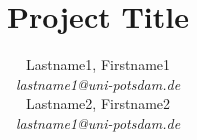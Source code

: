 \documentclass[twoside]{svproc}
\begin{document}
\setlength\parskip{7.5pt}

\title{Project Title}

\author{
	Lastname1, Firstname1 \\
	\textit{lastname1@uni-potsdam.de} \\
	Lastname2, Firstname2 \\
	\textit{lastname1@uni-potsdam.de}
}


\maketitle





\clearpage









\begin{appendices}

\end{appendices}
\end{document}
